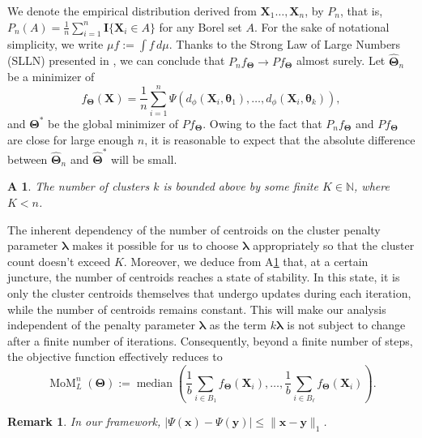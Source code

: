 \documentclass[12pt]{article}
\newcommand{\bX}{\boldsymbol{X}}
\newcommand{\bTheta}{\boldsymbol{\Theta}}
\newtheorem{assumption}{A\hspace{-2pt}}
\newtheorem{remark}{\textbf{Remark}}
\begin{document}
We denote the empirical distribution derived from $\bX_1\ldots,\bX_n$, by $P_n$, that is, $P_n(A) = \frac{1}{n}\sum_{i=1}^n \mathbf{I}\{\bX_i \in A\}$ for any Borel set $A$. 
For the sake of notational simplicity, we write $\mu f := \int f \, d\mu$. Thanks to the Strong Law of Large Numbers (SLLN) presented in \cite{athreya2006measure}, we can conclude that $P_n f_{\bTheta} \rightarrow Pf_{\bTheta}$ almost surely. Let $\widehat{\bm{\Theta}}_n$ be a minimizer of \[f_{\bm\Theta}(\bm{X})=\frac{1}{n} \sum_{i=1}^n \Psi(d_{\phi}(\bm{X}_i, \bm{\theta}_1), \ldots, d_{\phi}(\bm{X}_i, \bm{\theta}_k)),\]
and $\bm{\Theta}^*$ be the global minimizer of $Pf_{\bm{\Theta}}$. 
Owing to the fact that $P_n f_{\bm{\Theta}}$ and $P f_{\bTheta}$ are close for large enough $n$, it is reasonable to expect that the absolute difference between $\widehat{\bm{\Theta}}_n$ and $\bm{\widehat{\Theta}}^*$ will be small. %

\begin{assumption}\label{ass-2-cluster-count}
    The number of clusters $k$ is bounded above by some finite $K\in \mathbb{N}$, where $K < n$.
\end{assumption}

The inherent dependency of the number of centroids on the cluster penalty parameter $\bm{\lambda}$ makes it possible for us to choose $\bm{\lambda}$ appropriately so that the cluster count doesn't exceed $K$. Moreover, we deduce from A\ref{ass-2-cluster-count} that, at a certain juncture, the number of centroids reaches a state of stability. In this state, it is only the cluster centroids themselves that undergo updates during each iteration, while the number of centroids remains constant. This will make our analysis independent of the penalty parameter $\bm{\lambda}$ as the term $k\bm{\lambda}$ is not subject to change after a finite number of iterations. Consequently, beyond a finite number of steps, the objective function effectively reduces to 
\begin{equation}\label{DP-MoM-obj}
    \operatorname{MoM}_L^n(\bTheta) := \operatorname{median} \left(\frac{1}{b}\sum_{i\in B_{1}}f_{\bm{\Theta}}(\bm{X}_i), \ldots, \frac{1}{b}\sum_{i\in B_{\ell}}f_{\bm{\Theta}}(\bm{X}_i)\right).
\end{equation} 

\begin{remark}
    In our framework, $\displaystyle |\Psi(\bm{x})-\Psi(\bm{y})|\le \|\bm{x}-\bm{y}\|_1$.
\end{remark}
\end{document}
